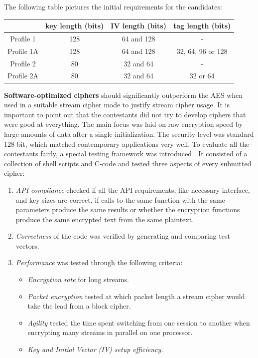 	The following table pictures the initial requirements for the candidates:
	\begin{table}[h!]
		\centering
		\begin{tabular}{| c c c c|} 
			\hline
			& key length (bits) & IV length (bits) & tag length (bits) \\ [0.5ex] 
			\hline
			Profile 1 & 128 & 64 and 128 & - \\ 
			Profile 1A & 128 & 64 and 128 & 32, 64, 96 or 128 \\
			Profile 2 & 80 & 32 and 64 & - \\
			Profile 2A & 80 & 32 and 64 & 32 or 64 \\[1ex] 
			\hline
		\end{tabular}
		\label{table:Initial requirements for the candidates}
	\end{table}
	
	\textbf{Software-optimized ciphers} should significantly outperform the AES when used in a suitable stream cipher mode to justify stream cipher usage. It is important to point out that the contestants did not try to develop ciphers that were good at everything. The main focus was laid on raw encryption speed by large amounts of data after a single initialization. The security level was standard 128 bit, which matched contemporary applications very well.
	To evaluate all the contestants fairly, a special testing framework was introduced \cite{canniere2008estream}. It consisted of a collection of shell scripts and C-code and tested three aspects of every submitted cipher:
	\begin{enumerate}
		\item \emph{API compliance} checked if all the API requirements, like necessary interface, and key sizes are correct, if calls to the same function with the same parameters produce the same results or whether the encryption functions produce the same encrypted text from the same plaintext. 
		\item \emph{Correctness} of the code was verified by generating and comparing test vectors.
		\item \emph{Performance} was tested through the following criteria:
		\begin{itemize}
			\item \emph{Encryption rate} for long streams.
			\item\emph{Packet encryption} tested at which packet length a stream cipher would take the lead from a block cipher.
			\item \emph{Agility} tested the time spent switching from one session to another when encrypting many streams in parallel on one processor.
			\item \emph{Key and Initial Vector (IV) setup efficiency}.
		\end{itemize}
	\end{enumerate}
	

